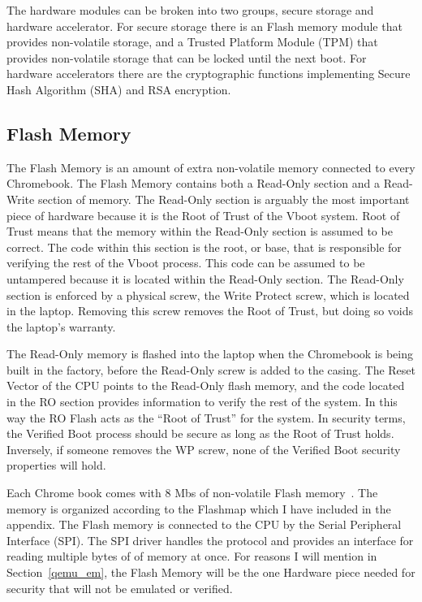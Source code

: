 \documentclass[../report.tex]{subfiles}
\begin{document}
The hardware modules can be broken into two groups, secure storage and hardware accelerator.
For secure storage there is an Flash memory module that provides non-volatile storage, and a Trusted Platform Module (TPM) that provides non-volatile storage that can be locked until the next boot.
For hardware accelerators there are the cryptographic functions implementing Secure Hash Algorithm (SHA) and RSA encryption. 

\subsection{Flash Memory}\label{flash_mem}

The Flash Memory is an amount of extra non-volatile memory connected to every Chromebook. 
The Flash Memory contains both a Read-Only section and a Read-Write section of memory.
The Read-Only section is arguably the most important piece of hardware because it is the Root of Trust of the Vboot system.
Root of Trust means that the memory within the Read-Only section is assumed to be correct.
The code within this section is the root, or base, that is responsible for verifying the rest of the Vboot process.
This code can be assumed to be untampered because it is located within the Read-Only section.
The Read-Only section is enforced by a physical screw, the Write Protect screw, which is located in the laptop.
Removing this screw removes the Root of Trust, but doing so voids the laptop's warranty.

The Read-Only memory is flashed into the laptop when the Chromebook is being built in the factory, before the Read-Only screw is added to the casing. 
The Reset Vector of the CPU points to the Read-Only flash memory, and the code located in the RO section provides information to verify the rest of the system.
In this way the RO Flash acts as the ``Root of Trust'' for the system.
In security terms, the Verified Boot process should be secure as long as the Root of Trust holds.
Inversely, if someone removes the WP screw, none of the Verified Boot security properties will hold.

Each Chrome book comes with 8 Mbs of non-volatile Flash memory~\cite{fw-summit}.
The memory is organized according to the Flashmap which I have included in the appendix.
The Flash memory is connected to the CPU by the Serial Peripheral Interface (SPI).
The SPI driver handles the protocol and provides an interface for reading multiple bytes of of memory at once.
For reasons I will mention in Section~\ref{qemu_em}, the Flash Memory will be the one Hardware piece needed for security that will not be emulated or verified.
\end{document}
